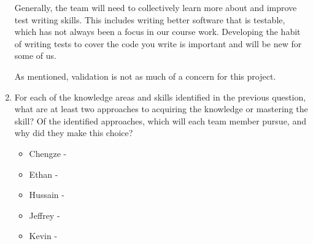 \documentclass[12pt, titlepage]{article}
\begin{document}
\begin{enumerate}
    Generally, the team will need to collectively learn more about and improve
    test writing skills. This includes writing better software that is
    testable, which has not always been a focus in our course work. Developing
    the habit of writing tests to cover the code you write is important and
    will be new for some of us.

    As mentioned, validation is not as much of a concern for this project.

  \item For each of the knowledge areas and skills identified in the previous
  question, what are at least two approaches to acquiring the knowledge or
  mastering the skill?  Of the identified approaches, which will each team
  member pursue, and why did they make this choice?
  \begin{itemize}
    \item Chengze -
    \item Ethan -
    \item Hussain -
    \item Jeffrey -
    \item Kevin -
  \end{itemize}
\end{enumerate}
\end{document}
